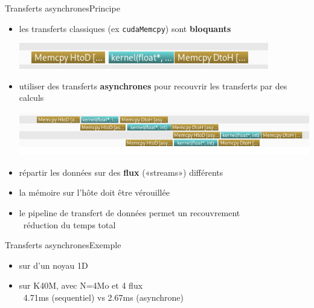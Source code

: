 \documentclass[11pt,mathserif]{beamer}
\newcommand{\scout}{\faAngellist}
\newcommand{\gezi}{\faLongArrowRight}
\newcommand{\argi}{\faLightbulbO}
\newcommand{\kontuz}{\faExclamationTriangle}
\newcommand{\pozik}{\faSmileO}
\newcommand{\adibi}{\faCommentO}
\newcommand{\harritu}{\faExclamation}
\begin{document}
\begin{frame}{Transferts asynchrones}{Principe}
  \begin{itemize}[<+->]
    \item[\kontuz] les transferts classiques (ex {\tt cudaMemcpy}) sont {\bf bloquants} \harritu
\begin{center}
  \includegraphics[width=0.6\linewidth]{fig/seq.png}
\end{center}
    \item[\scout] utiliser des transferts {\bf asynchrones } pour recouvrir les transferts par des calculs
\begin{center}
  \includegraphics[width=0.95\linewidth]{fig/async.png}
\end{center}
    \item[\argi] répartir les données sur des {\bf flux} («streams») différents
    \item[\kontuz] la mémoire sur l'hôte doit être vérouillée
    \item[\pozik] le pipeline de transfert de données permet un recouvrement \\ 
      \gezi\ réduction du temps total
  \end{itemize}
\end{frame}

\begin{frame}{Transferts asynchrones}{Exemple}
  \begin{itemize}[<+->]
    \item[\adibi] sur d'un noyau 1D 
      
    \item[\faClockO] sur K40M, avec N=4Mo et 4 flux \\ \gezi\ 4.71ms (sequentiel) vs 2.67ms (asynchrone) \pozik
  \end{itemize}
\end{frame}
\end{document}
